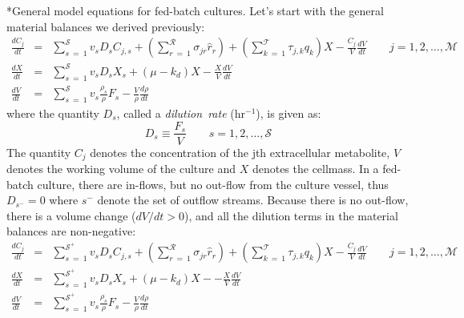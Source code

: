 \documentclass[11pt]{article}
\makeatletter
\theoremstyle{definition}
\renewcommand\subsection{\@startsection
	{subsection}{2}{0mm}
	{-0.05in}
	{-0.5\baselineskip}
	{\normalfont\normalsize\bfseries}}
\makeatother
\begin{document}
\subsection*{General model equations for fed-batch cultures.}
Let's start with the general material balances we derived previously:
\begin{eqnarray}\label{eqn-metabolite-dilution-dynamic}
	\frac{dC_{j}}{dt} &=& \sum_{s~=~1}^{\mathcal{S}}v_{s}D_{s}C_{j,s} + \left(\sum_{r~=~1}^{\mathcal{R}}\sigma_{jr}\hat{r}_{r}\right) + \left(\sum_{k~=~1}^{\mathcal{T}}\tau_{j,k}q_{k}\right)X  - \frac{C_{j}}{V}\frac{dV}{dt}\qquad j=1,2,\dots,\mathcal{M}\\
	\frac{dX}{dt} &=& \sum_{s~=~1}^{\mathcal{S}}v_{s}D_{s}X_{s}+\left(\mu - k_{d}\right)X - \frac{X}{V}\frac{dV}{dt}\\
	\frac{dV}{dt} &=& \sum_{s~=~1}^{\mathcal{S}}v_{s}\frac{\rho_{s}}{\rho}F_{s} - \frac{V}{\rho}\frac{d\rho}{dt}
\end{eqnarray}where the quantity $D_{s}$,  called a \textit{dilution~rate} (hr$^{-1}$), is given as:
\begin{equation}
	D_{s} \equiv \frac{F_{s}}{V}\qquad s=1,2,\dots,\mathcal{S}
\end{equation}The quantity $C_{j}$ denotes the concentration of the jth extracellular metabolite, $V$ denotes the working volume of the culture and $X$ denotes the cellmass.
In a fed-batch culture, there are in-flows, but no out-flow from the culture vessel, thus $D_{s^{-}} = 0$ where $s^{-}$ denote the set of outflow streams.
Because there is no out-flow, there is a volume change ($dV/dt > 0$), and all the dilution terms in the material balances are non-negative:
\begin{eqnarray}\label{eqn-metabolite-batch}
	\frac{dC_{j}}{dt} &=& \sum_{s~=~1}^{\mathcal{S^{+}}}v_{s}D_{s}C_{j,s} + \left(\sum_{r~=~1}^{\mathcal{R}}\sigma_{jr}\hat{r}_{r}\right) + \left(\sum_{k~=~1}^{\mathcal{T}}\tau_{j,k}q_{k}\right)X - \frac{C_{j}}{V}\frac{dV}{dt} \qquad j=1,2,\dots,\mathcal{M}\\
	\frac{dX}{dt} &=& \sum_{s~=~1}^{\mathcal{S^{+}}}v_{s}D_{s}X_{s} + \left(\mu - k_{d}\right)X - - \frac{X}{V}\frac{dV}{dt}\\
	\frac{dV}{dt} &=& \sum_{s~=~1}^{\mathcal{S^{+}}}v_{s}\frac{\rho_{s}}{\rho}F_{s} - \frac{V}{\rho}\frac{d\rho}{dt}
\end{eqnarray}
\end{document}
